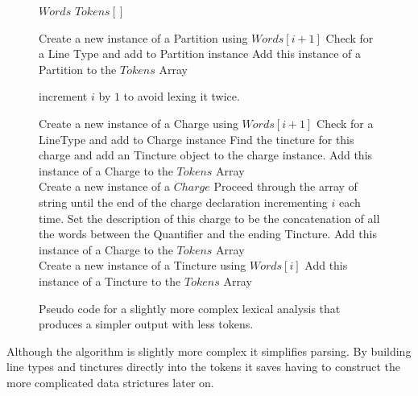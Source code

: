 \begin{figure}[H]
\begin{algorithmic}[1]


\STATE $Words $ 
\STATE $Tokens[]$ \\

		\STATE Create a new instance of a Partition using $Words[i+1]$
		\STATE Check for a Line Type and add to Partition instance
		\STATE Add this instance of a Partition to the $Tokens$ Array

		\STATE increment $i$ by $1$ to avoid lexing it twice. 

		\STATE Create a new instance of a Charge using $Words[i+1]$
		\STATE Check for a LineType and add to Charge instance
		\STATE Find the tincture for this charge and add an Tincture object to the charge instance. 
		\STATE Add this instance of a Charge to the $Tokens$ Array \\

		\STATE Create a new instance of a $Charge$ 
		\STATE Proceed through the array of string until the end of the charge declaration incrementing $i$ each time.  
		\STATE Set the description of this charge to be the concatenation of all the words between the Quantifier and the ending Tincture.
		\STATE Add this instance of a Charge to the $Tokens$ Array \\

		\STATE Create a new instance of a Tincture using $Words[i]$
		\STATE Add this instance of a Tincture to the $Tokens$ Array
 	\ENDIF
\ENDFOR

\end{algorithmic}
\caption{Pseudo code for a slightly more complex lexical analysis that produces a simpler output with less tokens.}
\end{figure}

Although the algorithm is slightly more complex it simplifies parsing.  By building line types and tinctures directly into the tokens it saves having to construct the more complicated data strictures later on. 


